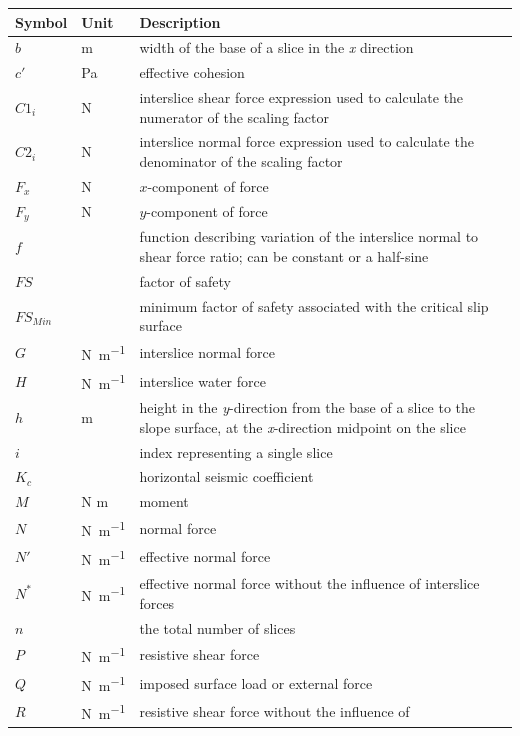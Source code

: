 \documentclass[12pt]{article}
\renewcommand{\arraystretch}{1}
\begin{document}
\renewcommand{\arraystretch}{1.6}
\setlength{\tabcolsep}{20pt}
\begin{longtable*}{  l  l  p{8.5cm}  }
\hline
\textbf{Symbol} & \textbf{Unit} & \textbf{Description} \\
\hline
$b$ & \si{\meter}& width of the base of a slice in the \textit{x} direction
\\
$c'$ & \si{\pascal} & effective cohesion 
\\
${C1_{i}}$ & \si{\newton}& interslice shear force expression used to calculate 
the numerator of the scaling factor
\\
${C2_{i}}$ & \si{\newton}& interslice normal force expression used to 
calculate the denominator of the scaling factor
\\
${F_{x}}$ & \si{\newton} &$x$-component of force
\\
${F_{y}}$ & \si{\newton} &$y$-component of force
\\
$f$ & & function describing variation of the interslice normal to shear force 
ratio; can be constant or a half-sine
\\
$FS$ & & factor of safety
\\
$FS_{Min}$ & & minimum factor of safety associated with the critical slip 
surface
\\
$G$ & \si{\newton\per\meter} & interslice normal force
\\
$H$ & \si{\newton\per\meter} & interslice water force
\\
$h$ &  \si{\meter}& height in the \textit{y}-direction from the base of a slice 
to the slope surface, at the \textit{x}-direction midpoint on the slice
\\
$i$ & & index representing a single slice 
\\
${K_{c}}$ & & horizontal seismic coefficient
\\
$M$ & N \si{\meter}& moment
\\
$N$ & \si{\newton\per\meter} & normal force
\\
$N'$ &\si{\newton\per\meter} & effective normal force
\\
$N^*$ &\si{\newton\per\meter} & effective normal force without the influence of 
interslice forces
\\
$n$ & & the total number of slices
\\
$P$ & \si{\newton\per\meter} & resistive shear force
\\
$Q$ & \si{\newton\per\meter} & imposed surface load or external force
\\
$R$ & \si{\newton\per\meter} & resistive shear force without the influence of 

\end{longtable*}
\end{document}
